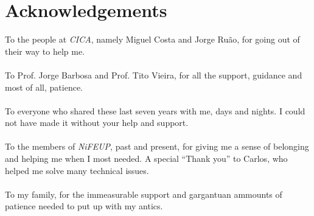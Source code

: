 \chapter*{Acknowledgements}

To the people at \emph{CICA}, namely Miguel Costa and Jorge Ruão, for going out of their way to help me.\\
\ \\
To Prof. Jorge Barbosa and Prof. Tito Vieira, for all the support, guidance and most of all, patience.\\
\ \\
To everyone who shared these last seven years with me, days and nights. I could not have made it without your help and support.\\
\ \\
To the members of \emph{NiFEUP}, past and present, for giving me a sense of belonging and helping me when I most needed. A special ``Thank you'' to Carlos, who helped me solve many technical issues.\\
\ \\
To my family, for the immeasurable support and gargantuan ammounts of patience needed to put up with my antics.

\vspace{10mm}
